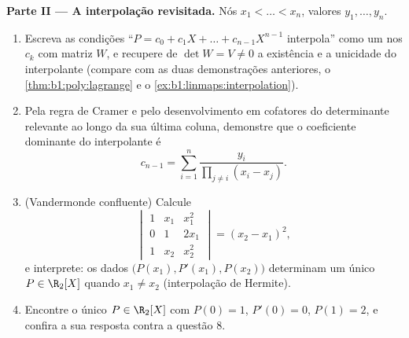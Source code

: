 \begin{problem}
\medskip
\noindent\textbf{Parte II --- A interpolação revisitada.} Nós
$x_1 < \dots < x_n$, valores $y_1, \dots, y_n$.
\begin{enumerate}[resume]
  \item Escreva as condições ``$P = c_0 + c_1X + \dots +
        c_{n-1}X^{n-1}$ interpola'' como um  nos $c_k$ com matriz $W$, e recupere de $\det W = V \neq
        0$ a
        existência e a unicidade do interpolante (compare com as
        duas demonstrações anteriores, o \cref{thm:b1:poly:lagrange} e o \cref{ex:b1:linmaps:interpolation}).
  \item Pela regra de Cramer e pelo desenvolvimento em cofatores do
        determinante relevante ao longo da sua última coluna,
        demonstre que o coeficiente dominante do interpolante é
        \[
        c_{n-1} = \sum_{i=1}^{n}
        \frac{y_i}{\prod_{j \neq i}(x_i - x_j)} .
        \]
  \item (Vandermonde confluente) Calcule
        \[
        \begin{vmatrix}
        1 & x_1 & x_1^2\\
        0 & 1 & 2x_1\\
        1 & x_2 & x_2^2
        \end{vmatrix}
        = (x_2 - x_1)^2 ,
        \]
        e interprete: os dados $\bigl(P(x_1), P'(x_1),
        P(x_2)\bigr)$ determinam um único $P \in \R_2[X]$
        quando $x_1 \neq x_2$ (interpolação de Hermite).
  \item Encontre o único $P \in \R_2[X]$ com $P(0) = 1$, $P'(0)
        = 0$, $P(1) = 2$, e confira a
        sua resposta contra a questão 8.
\end{enumerate}


\end{problem}
